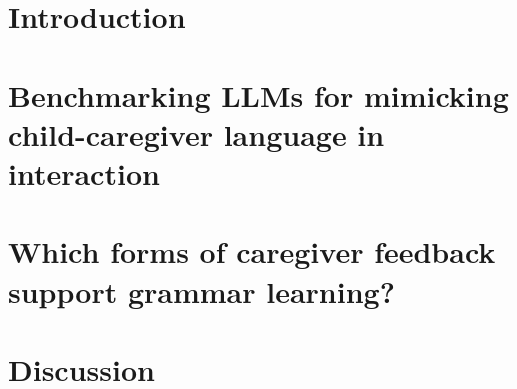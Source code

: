 \section{Introduction}
\begingroup
\demotesectioning

\endgroup


\section{Benchmarking LLMs for mimicking child-caregiver language in interaction}
\begingroup
\demotesectioning

\endgroup

\section{Which forms of caregiver feedback support grammar learning?}
\begingroup
\demotesectioning

\endgroup

\section{Discussion}
\begingroup
\demotesectioning

\endgroup
